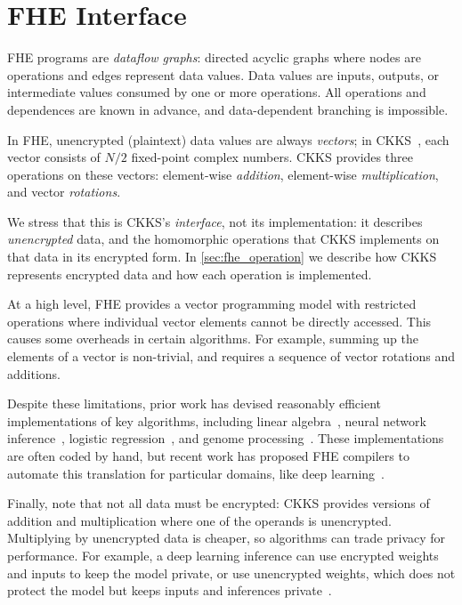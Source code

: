 \section{FHE Interface}
\label{sec:fhe_mapping}

FHE programs are \emph{dataflow graphs}: directed acyclic graphs where nodes
are operations and edges represent data values. Data values are inputs,
outputs, or intermediate values consumed by one or more operations. All
operations and dependences are known in advance, and data-dependent branching
is impossible.

In FHE, unencrypted (plaintext) data values are always \emph{vectors}; in
CKKS~\cite{brakerski:toct14:leveled}, each vector consists of $N/2$ fixed-point
complex numbers. CKKS provides three operations on these vectors: element-wise
\emph{addition}, element-wise \emph{multiplication}, and vector
\emph{rotations}.

We stress that this is CKKS's \emph{interface}, not its implementation: it
describes \emph{unencrypted} data, and the homomorphic operations that CKKS
implements on that data in its encrypted form.  In \autoref{sec:fhe_operation}
we describe how CKKS represents encrypted data and how each operation is
implemented.

At a high level, FHE provides a vector programming model with restricted
operations where individual vector elements cannot be directly accessed.  This
causes some overheads in certain algorithms. For example, summing up the
elements of a vector is non-trivial, and requires a sequence of vector
rotations and additions.

Despite these limitations, prior work has devised reasonably efficient
implementations of key algorithms, including linear
algebra~\cite{halevi:crypto14:algorithms}, neural network
inference~\cite{brutzkus:icml19:low, gilad:icml16:cryptonets}, logistic
regression~\cite{han:iacr18:efficient}, and genome
processing~\cite{blatt:nas20:secure}. These implementations are often coded by
hand, but recent work has proposed FHE compilers to automate this translation
for particular domains, like deep
learning~\cite{dathathri:pldi19:chet,dathathri:pldi20:eva}.

Finally, note that not all data must be encrypted: CKKS provides versions of
addition and multiplication where one of the operands is unencrypted.
Multiplying by unencrypted data is cheaper, so algorithms can trade privacy for
performance. For example, a deep learning inference can use encrypted weights
and inputs to keep the model private, or use unencrypted weights, which does
not protect the model but keeps inputs and inferences
private~\cite{brutzkus:icml19:low}.

